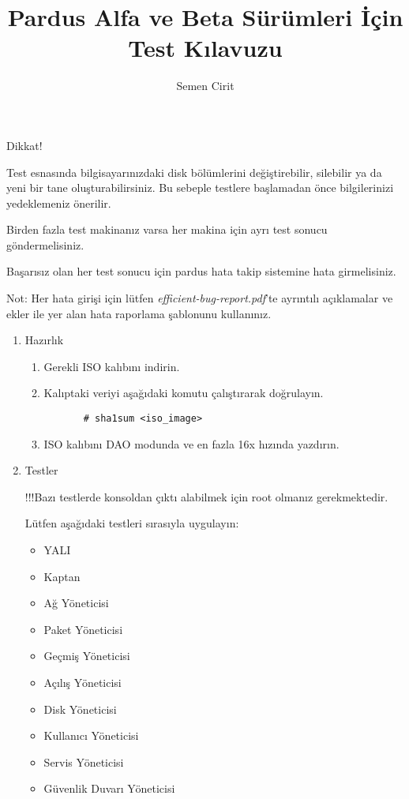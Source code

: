 \documentclass[a4paper,10pt]{article}
\title{Pardus Alfa ve Beta Sürümleri İçin Test Kılavuzu}
\author{Semen Cirit}
\begin{document}
\maketitle

Dikkat!

    Test esnasında bilgisayarınızdaki disk bölümlerini değiştirebilir, silebilir ya da yeni bir tane oluşturabilirsiniz. Bu sebeple testlere başlamadan önce bilgilerinizi yedeklemeniz önerilir.
    
    Birden fazla test makinanız varsa her makina için ayrı test sonucu göndermelisiniz.

    Başarısız olan her test sonucu için pardus hata takip sistemine hata girmelisiniz.

    Not: Her hata girişi için lütfen \emph{efficient-bug-report.pdf}'te ayrıntılı açıklamalar ve ekler ile yer alan hata raporlama şablonunu kullanınız.

\begin{enumerate}
\item Hazırlık
  \begin{enumerate}
    \item Gerekli ISO kalıbını indirin.
    \item Kalıptaki veriyi aşağıdaki komutu çalıştırarak doğrulayın.
      \begin{verbatim}
       # sha1sum <iso_image>
      \end{verbatim}
    \item ISO kalıbını DAO modunda ve en fazla 16x hızında yazdırın.
  \end{enumerate}
  \item Testler
    
 	!!!Bazı testlerde konsoldan çıktı alabilmek için root olmanız gerekmektedir.
	
    Lütfen aşağıdaki testleri sırasıyla uygulayın:
    \begin{itemize}
    \item YALI
    \item Kaptan
    \item Ağ Yöneticisi
    \item Paket Yöneticisi
    \item Geçmiş Yöneticisi
    \item Açılış Yöneticisi
    \item Disk Yöneticisi
    \item Kullanıcı Yöneticisi
    \item Servis Yöneticisi
    \item Güvenlik Duvarı Yöneticisi
    \end{itemize}
 \end{enumerate}
\end{document}
